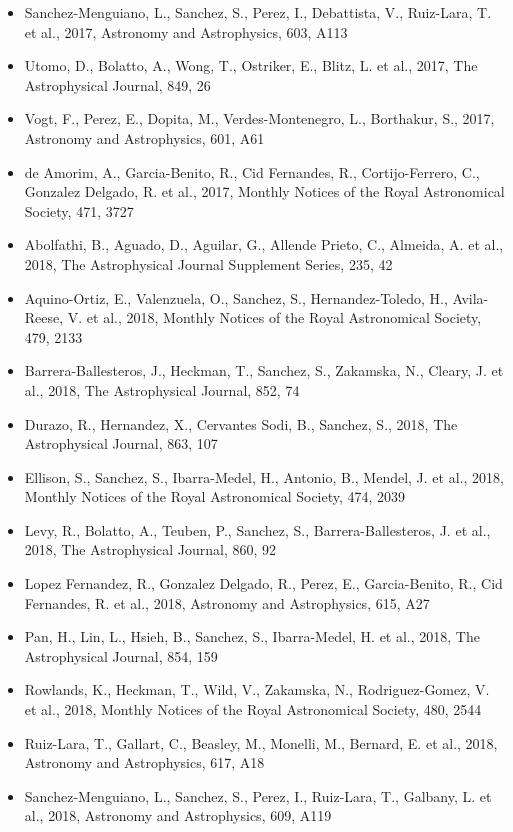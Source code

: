 \documentclass{letter}
\begin{document}
\begin{enumerate}
\begin{itemize}
\item Sanchez-Menguiano, L., Sanchez, S., Perez, I., Debattista, V., Ruiz-Lara, T. et al., 2017, Astronomy and Astrophysics, 603, A113
\item Utomo, D., Bolatto, A., Wong, T., Ostriker, E., Blitz, L. et al., 2017, The Astrophysical Journal, 849, 26
\item Vogt, F., Perez, E., Dopita, M., Verdes-Montenegro, L., Borthakur, S., 2017, Astronomy and Astrophysics, 601, A61
\item de Amorim, A., Garcia-Benito, R., Cid Fernandes, R., Cortijo-Ferrero, C., Gonzalez Delgado, R. et al., 2017, Monthly Notices of the Royal Astronomical Society, 471, 3727
\item Abolfathi, B., Aguado, D., Aguilar, G., Allende Prieto, C., Almeida, A. et al., 2018, The Astrophysical Journal Supplement Series, 235, 42
\item Aquino-Ortiz, E., Valenzuela, O., Sanchez, S., Hernandez-Toledo, H., Avila-Reese, V. et al., 2018, Monthly Notices of the Royal Astronomical Society, 479, 2133
\item Barrera-Ballesteros, J., Heckman, T., Sanchez, S., Zakamska, N., Cleary, J. et al., 2018, The Astrophysical Journal, 852, 74
\item Durazo, R., Hernandez, X., Cervantes Sodi, B., Sanchez, S., 2018, The Astrophysical Journal, 863, 107
\item Ellison, S., Sanchez, S., Ibarra-Medel, H., Antonio, B., Mendel, J. et al., 2018, Monthly Notices of the Royal Astronomical Society, 474, 2039
\item Levy, R., Bolatto, A., Teuben, P., Sanchez, S., Barrera-Ballesteros, J. et al., 2018, The Astrophysical Journal, 860, 92
\item Lopez Fernandez, R., Gonzalez Delgado, R., Perez, E., Garcia-Benito, R., Cid Fernandes, R. et al., 2018, Astronomy and Astrophysics, 615, A27
\item Pan, H., Lin, L., Hsieh, B., Sanchez, S., Ibarra-Medel, H. et al., 2018, The Astrophysical Journal, 854, 159
\item Rowlands, K., Heckman, T., Wild, V., Zakamska, N., Rodriguez-Gomez, V. et al., 2018, Monthly Notices of the Royal Astronomical Society, 480, 2544
\item Ruiz-Lara, T., Gallart, C., Beasley, M., Monelli, M., Bernard, E. et al., 2018, Astronomy and Astrophysics, 617, A18
\item Sanchez-Menguiano, L., Sanchez, S., Perez, I., Ruiz-Lara, T., Galbany, L. et al., 2018, Astronomy and Astrophysics, 609, A119

\end{itemize}
\end{enumerate}
\end{document}
